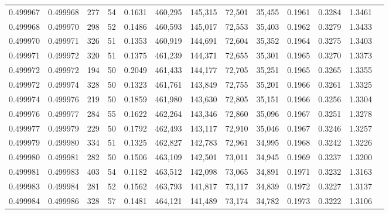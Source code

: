 \begin{tabular}{rrrrrrrrrrrrr}
0.499967 & 0.499968 & 277 &  54 &                                     0.1631 & 460,295 & 145,315 &  72,501 &  35,455 & 0.1961 & 0.3284 & 1.3461 \\
0.499968 & 0.499970 & 298 &  52 &                                     0.1486 & 460,593 & 145,017 &  72,553 &  35,403 & 0.1962 & 0.3279 & 1.3433 \\
0.499970 & 0.499971 & 326 &  51 &                                     0.1353 & 460,919 & 144,691 &  72,604 &  35,352 & 0.1964 & 0.3275 & 1.3403 \\
0.499971 & 0.499972 & 320 &  51 &                                     0.1375 & 461,239 & 144,371 &  72,655 &  35,301 & 0.1965 & 0.3270 & 1.3373 \\
0.499972 & 0.499972 & 194 &  50 &                                     0.2049 & 461,433 & 144,177 &  72,705 &  35,251 & 0.1965 & 0.3265 & 1.3355 \\
0.499972 & 0.499974 & 328 &  50 &                                     0.1323 & 461,761 & 143,849 &  72,755 &  35,201 & 0.1966 & 0.3261 & 1.3325 \\
0.499974 & 0.499976 & 219 &  50 &                                     0.1859 & 461,980 & 143,630 &  72,805 &  35,151 & 0.1966 & 0.3256 & 1.3304 \\
0.499976 & 0.499977 & 284 &  55 &                                     0.1622 & 462,264 & 143,346 &  72,860 &  35,096 & 0.1967 & 0.3251 & 1.3278 \\
0.499977 & 0.499979 & 229 &  50 &                                     0.1792 & 462,493 & 143,117 &  72,910 &  35,046 & 0.1967 & 0.3246 & 1.3257 \\
0.499979 & 0.499980 & 334 &  51 &                                     0.1325 & 462,827 & 142,783 &  72,961 &  34,995 & 0.1968 & 0.3242 & 1.3226 \\
0.499980 & 0.499981 & 282 &  50 &                                     0.1506 & 463,109 & 142,501 &  73,011 &  34,945 & 0.1969 & 0.3237 & 1.3200 \\
0.499981 & 0.499983 & 403 &  54 &                                     0.1182 & 463,512 & 142,098 &  73,065 &  34,891 & 0.1971 & 0.3232 & 1.3163 \\
0.499983 & 0.499984 & 281 &  52 &                                     0.1562 & 463,793 & 141,817 &  73,117 &  34,839 & 0.1972 & 0.3227 & 1.3137 \\
0.499984 & 0.499986 & 328 &  57 &                                     0.1481 & 464,121 & 141,489 &  73,174 &  34,782 & 0.1973 & 0.3222 & 1.3106 \\

\end{tabular}
